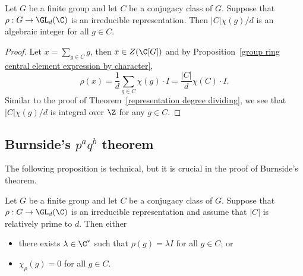 \begin{corollary}\label{representation |C|chi(g)/d is algebraic integer}
Let $G$ be a finite group and let $C$ be a conjugacy class of $G$. Suppose that $\rho:G\to\GL_d(\C)$ is an irreducible representation. Then $|C|\chi(g)/d$ is an algebraic integer for all $g\in C$.
\end{corollary}
\begin{proof}
Let $x=\sum_{g\in C}g$, then $x\in Z(\C[G])$ and by Proposition~\ref{group ring central element expression by character},
\[\rho(x)=\frac{1}{d}\sum_{g\in C}\chi(g)\cdot I=\frac{|C|}{d}\chi(C)\cdot I.\]
Similar to the proof of Theorem~\ref{representation degree dividing}, we see that $|C|\chi(g)/d$ is integral over $\Z$ for any $g\in C$.
\end{proof}
\subsection{Burnside's \boldmath$p^aq^b$ theorem}
The following proposition is technical, but it is crucial in the proof of Burnside's theorem.
\begin{proposition}\label{representation degree coprime to conjugate class}
Let $G$ be a finite group and let $C$ be a conjugacy class of $G$. Suppose that $\rho:G\to\GL_d(\C)$ is an irreducible representation and assume that $|C|$ is relatively prime to $d$. Then either
\begin{itemize}
\item there exists $\lambda\in\C^*$ such that $\rho(g)=\lambda I$ for all $g\in C$; or
\item $\chi_\rho(g)=0$ for all $g\in C$.
\end{itemize}
\end{proposition}
